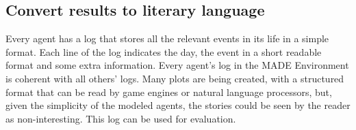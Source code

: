 \documentclass[letterpaper]{article}
\begin{document}
\subsection{Convert results to literary language}

Every agent has a log that stores all the relevant events in its life
in a simple format. Each line of the log indicates the day, the event
in a short readable format and some extra information. Every agent's
log in the MADE Environment is coherent with all others' logs. Many
plots are being created, with a structured format that can be read by
game engines or natural language processors, but, given the simplicity
of the modeled agents, the stories could be seen by the reader as
non-interesting. This log can be used for evaluation. %












\end{document}

